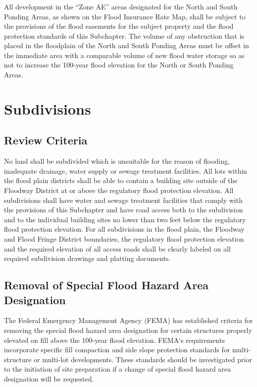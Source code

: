 \subsubsection{}
All development in the “Zone AE” areas designated for the North and South Ponding Areas, as shown on the Flood Insurance Rate Map, shall be subject to the provisions of the flood easements for the subject property and the flood protection standards of this Subchapter. The volume of any obstruction that is placed in the floodplain of the North and South Ponding Areas must be offset in the immediate area with a comparable volume of new flood water storage so as not to increase the 100-year flood elevation for the North or South Ponding Areas.

\section{Subdivisions}
\subsection{Review Criteria}
No land shall be subdivided which is unsuitable for the reason of flooding, inadequate drainage, water supply or sewage treatment facilities. All lots within the flood plain districts shall be able to contain a building site outside of the Floodway District at or above the regulatory flood protection elevation. All subdivisions shall have water and sewage treatment facilities that comply with the provisions of this Subchapter and have road access both to the subdivision and to the individual building sites no lower than two feet below the regulatory flood protection elevation. For all subdivisions in the flood plain, the Floodway and Flood Fringe District boundaries, the regulatory flood protection elevation and the required elevation of all access roads shall be clearly labeled on all required subdivision drawings and platting documents.
\subsection{Removal of Special Flood Hazard Area Designation}
The Federal Emergency Management Agency (FEMA) has established criteria for removing the special flood hazard area designation for certain structures properly elevated on fill above the 100-year flood elevation. FEMA‘s requirements incorporate specific fill compaction and side slope protection standards for multi-structure or multi-lot developments. These standards should be investigated prior to the initiation of site preparation if a change of special flood hazard area designation will be requested.

